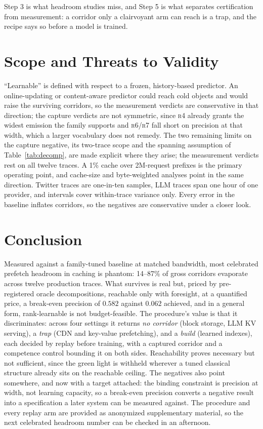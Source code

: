 \documentclass[letterpaper]{article} %
\newcommand{\rung}[1]{\textsc{#1}}
\begin{document}
\noindent Step 3 is what headroom studies miss, and Step 5 is what separates certification from measurement: a corridor only a clairvoyant arm can reach is a trap, and the recipe says so before a model is trained.

\section{Scope and Threats to Validity}
``Learnable'' is defined with respect to a frozen, history-based predictor. An online-updating or content-aware predictor could reach cold objects and would raise the surviving corridors, so the measurement verdicts are conservative in that direction; the capture verdicts are not symmetric, since \rung{r4} already grants the widest emission the family supports and \rung{r6}/\rung{r7} fall short on precision at that width, which a larger vocabulary does not remedy. The two remaining limits on the capture negative, its two-trace scope and the spanning assumption of Table~\ref{tab:decomp}, are made explicit where they arise; the measurement verdicts rest on all twelve traces. A 1\% cache over 2M-request prefixes is the primary operating point, and cache-size and byte-weighted analyses point in the same direction. Twitter traces are one-in-ten samples, LLM traces span one hour of one provider, and intervals cover within-trace variance only. Every error in the baseline inflates corridors, so the negatives are conservative under a closer look.

\section{Conclusion}
Measured against a family-tuned baseline at matched bandwidth, most celebrated prefetch headroom in caching is phantom: 14--87\% of gross corridors evaporate across twelve production traces. What survives is real but, priced by pre-registered oracle decompositions, reachable only with foresight, at a quantified price, a break-even precision of $0.582$ against $0.062$ achieved, and in a general form, rank-learnable is not budget-feasible. The procedure's value is that it discriminates: across four settings it returns \emph{no corridor} (block storage, LLM KV serving), a \emph{trap} (CDN and key-value prefetching), and a \emph{build} (learned indexes), each decided by replay before training, with a captured corridor and a competence control bounding it on both sides. Reachability proves necessary but not sufficient, since the green light is withheld wherever a tuned classical structure already sits on the reachable ceiling. The negatives also point somewhere, and now with a target attached: the binding constraint is precision at width, not learning capacity, so a break-even precision converts a negative result into a specification a later system can be measured against. The procedure and every replay arm are provided as anonymized supplementary material, so the next celebrated headroom number can be checked in an afternoon.


\end{document}
